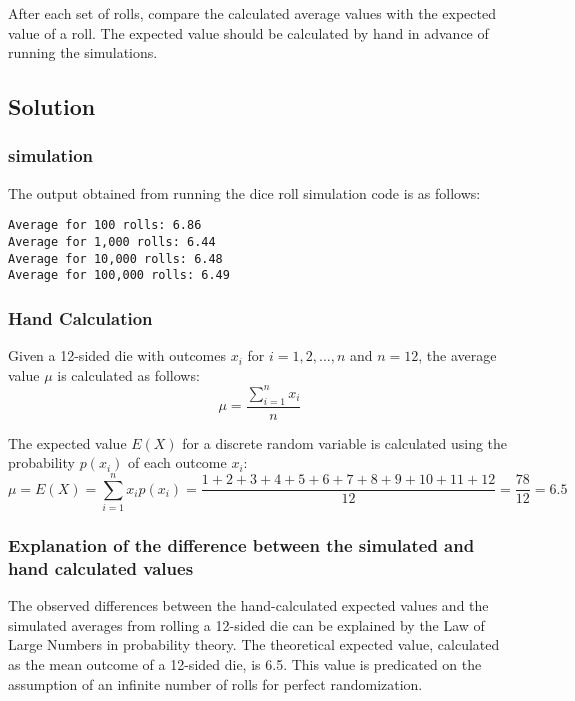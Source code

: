 \documentclass[a4paper, 10pt]{article}
\begin{document}
            After each set of rolls, compare the calculated average values with the expected value of a roll. The expected value should be calculated by hand in advance of running the simulations.

        \subsection{Solution}
            \subsubsection{simulation}
                
                The output obtained from running the dice roll simulation code is as follows:

                \begin{verbatim}
Average for 100 rolls: 6.86
Average for 1,000 rolls: 6.44
Average for 10,000 rolls: 6.48
Average for 100,000 rolls: 6.49
                \end{verbatim}

            \subsubsection{Hand Calculation}
                Given a 12-sided die with outcomes $x_i$ for $i=1,2,\ldots,n$ and $n=12$, the average value $\mu$ is calculated as follows:
                \begin{equation*}
                    \mu = \frac{\sum_{i=1}^{n} x_i}{n}
                \end{equation*}

                The expected value $E(X)$ for a discrete random variable is calculated using the probability $p(x_i)$ of each outcome $x_i$:
                \begin{equation*}
                    \mu = E(X) = \sum_{i=1}^{n} x_i p(x_i) = \frac{1 + 2 + 3 + 4 + 5 + 6 + 7 + 8 + 9 + 10 + 11 + 12}{12} = \frac{78}{12} = 6.5
                \end{equation*}
    
            \subsubsection{Explanation of the difference between the simulated and hand calculated values}
                The observed differences between the hand-calculated expected values and the simulated averages from rolling a 12-sided die can be explained by the Law of Large Numbers in probability theory. The theoretical expected value, calculated as the mean outcome of a 12-sided die, is 6.5. This value is predicated on the assumption of an infinite number of rolls for perfect randomization.
\end{document}
